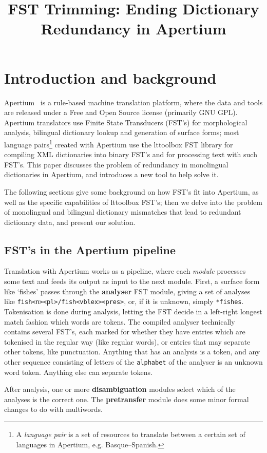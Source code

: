 \documentclass[10pt, a4paper]{article}
\title{FST Trimming: Ending Dictionary Redundancy in Apertium} %
\newcommand{\ana}[1]{\texttt{#1}}
\newcommand{\f}[1]{`#1'}
\begin{document}
\maketitleabstract

\section{Introduction and background}

Apertium~\cite{forcada2011afp} is a rule-based machine translation
platform, where the data and tools are released under a Free and Open
Source license (primarily GNU GPL). Apertium translators use Finite
State Transducers (FST's) for morphological analysis, bilingual
dictionary lookup and generation of surface forms; most language
pairs\footnote{A \emph{language pair} is a set of resources to
    translate between a certain set of languages in Apertium, e.g.
Basque--Spanish.} created with Apertium use the lttoolbox FST
library for compiling XML dictionaries into binary FST's and for
processing text with such FST's. This paper discusses the problem of
redundancy in monolingual dictionaries in Apertium, and introduces a
new tool to help solve it.

The following sections give some background on how FST's fit into
Apertium, as well as the specific capabilities of lttoolbox
FST's; then we delve into the problem of monolingual and bilingual
dictionary mismatches that lead to redundant dictionary data, and
present our solution.

\subsection{FST's in the Apertium pipeline}
\label{sec:pipeline}

Translation with Apertium works as a pipeline, where each
\emph{module} processes some text and feeds its output as input to the
next module. First, a surface form like \f{fishes} passes through the
\textbf{analyser} FST module, giving a set of analyses like
\ana{fish<n><pl>/fish<vblex><pres>}, or, if it is unknown, simply
\ana{*fishes}. Tokenisation is done during analysis, letting the FST
decide in a left-right longest match fashion which words are tokens.
The compiled analyser technically contains several FST's, each marked
for whether they have entries which are tokenised in the regular
way (like regular words), or entries that may separate other tokens,
like punctuation. Anything that has an analysis is a token, and any
other sequence consisting of letters of the \texttt{alphabet} of the
analyser is an unknown word token. Anything else can separate tokens.

After analysis, one or more \textbf{disambiguation} modules select
which of the analyses is the correct one. The \textbf{pretransfer}
module does some minor formal changes to do with multiwords.
\end{document}
